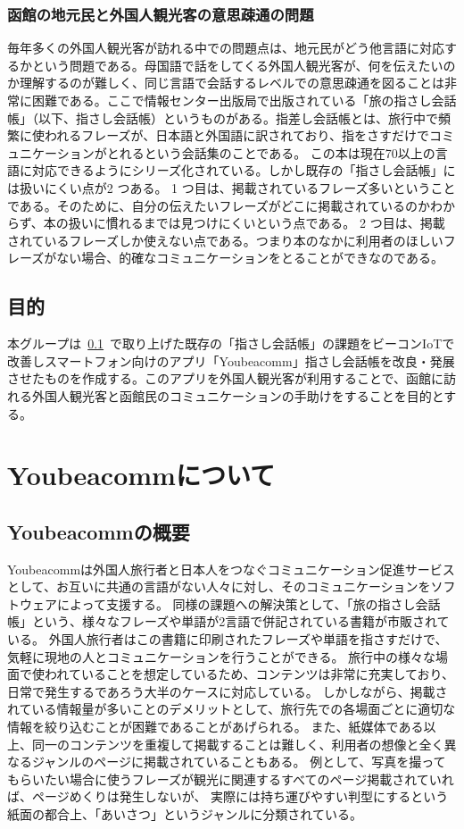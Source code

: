 \documentclass[11pt,papersize]{jsbook}
\begin{document}
\subsection{函館の地元民と外国人観光客の意思疎通の問題}\label{sec:mokuteki}
 毎年多くの外国人観光客が訪れる中での問題点は、地元民がどう他言語に対応するかという問題である。母国語で話をしてくる外国人観光客が、何を伝えたいのか理解するのが難しく、同じ言語で会話するレベルでの意思疎通を図ることは非常に困難である。ここで情報センター出版局で出版されている「旅の指さし会話帳」（以下、指さし会話帳）というものがある。指差し会話帳とは、旅行中で頻繁に使われるフレーズが、日本語と外国語に訳されており、指をさすだけでコミュニケーションがとれるという会話集のことである。
この本は現在70以上の言語に対応できるようにシリーズ化されている。しかし既存の「指さし会話帳」には扱いにくい点が2 つある。
1 つ目は、掲載されているフレーズ多いということである。そのために、自分の伝えたいフレーズがどこに掲載されているのかわからず、本の扱いに慣れるまでは見つけにくいという点である。
2 つ目は、掲載されているフレーズしか使えない点である。つまり本のなかに利用者のほしいフレーズがない場合、的確なコミュニケーションをとることができなのである。

\section{目的}
 本グループは~\ref{sec:mokuteki}~で取り上げた既存の「指さし会話帳」の課題をビーコンIoTで改善しスマートフォン向けのアプリ「Youbeacomm」指さし会話帳を改良・発展させたものを作成する。このアプリを外国人観光客が利用することで、函館に訪れる外国人観光客と函館民のコミュニケーションの手助けをすることを目的とする。


\chapter{Youbeacommについて}

\section{Youbeacommの概要}
 Youbeacommは外国人旅行者と日本人をつなぐコミュニケーション促進サービスとして、お互いに共通の言語がない人々に対し、そのコミュニケーションをソフトウェアによって支援する。
同様の課題への解決策として、「旅の指さし会話帳」という、様々なフレーズや単語が2言語で併記されている書籍が市販されている。
外国人旅行者はこの書籍に印刷されたフレーズや単語を指さすだけで、気軽に現地の人とコミュニケーションを行うことができる。
旅行中の様々な場面で使われていることを想定しているため、コンテンツは非常に充実しており、日常で発生するであろう大半のケースに対応している。
しかしながら、掲載されている情報量が多いことのデメリットとして、旅行先での各場面ごとに適切な情報を絞り込むことが困難であることがあげられる。
また、紙媒体である以上、同一のコンテンツを重複して掲載することは難しく、利用者の想像と全く異なるジャンルのページに掲載されていることもある。
例として、写真を撮ってもらいたい場合に使うフレーズが観光に関連するすべてのページ掲載されていれば、ページめくりは発生しないが、
実際には持ち運びやすい判型にするという紙面の都合上、「あいさつ」というジャンルに分類されている。
\end{document}
